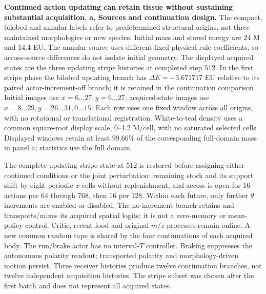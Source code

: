 \textbf{Continued action updating can retain tissue without sustaining substantial acquisition.}
\textbf{a, Sources and continuation design.} The compact, bilobed and annular labels refer to predetermined structural origins, not three maintained morphologies or new species. Initial mass and stored energy are 24 M and 14.4 EU. The annular source uses different fixed physical-rule coefficients, so across-source differences do not isolate initial geometry. The displayed acquired states are the three updating stripe histories at completed step 512. In the first stripe phase the bilobed updating branch has $\Delta E=-3.671717$ EU relative to its paired actor-increment-off branch; it is retained in the continuation comparison. Initial images use $x=6\ldots27,y=6\ldots27$; acquired-state images use $x=8\ldots29,y=26\ldots31,0\ldots15$. Each row uses one fixed window across all origins, with no rotational or translational registration. White-to-teal density uses a common square-root display scale, 0--1.2 M/cell, with no saturated selected cells. Displayed windows retain at least 99.66\% of the corresponding full-domain mass in panel a; statistics use the full domain.

The complete updating stripe state at 512 is restored before assigning either continued conditions or the joint perturbation: remaining stock and its support shift by eight periodic $x$ cells without replenishment, and access is open for 16 actions per 64 through 768, then 16 per 128. Within each future, only further $\theta$ increments are enabled or disabled. The no-increment branch retains and transports/mixes its acquired spatial logits; it is not a zero-memory or mean-policy control. Critic, recent-food and original $m/z$ processes remain online. A new common random tape is shared by the four continuations of each acquired body. The run/brake actor has no interval-$T$ controller. Braking suppresses the autonomous polarity readout; transported polarity and morphology-driven motion persist. Three receiver histories produce twelve continuation branches, not twelve independent acquisition histories. The stripe subset was chosen after the first batch and does not represent all acquired states.

